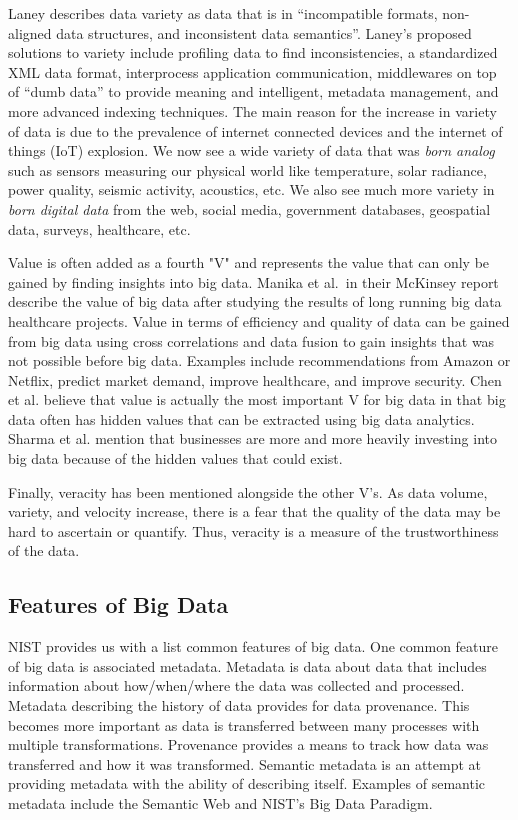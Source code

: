 \documentclass[]{article}
\begin{document}
Laney describes data variety as data that is in ``incompatible formats, non-aligned data structures, and inconsistent data semantics''. Laney's proposed solutions to variety include profiling data to find inconsistencies, a standardized XML data format, interprocess application communication, middlewares on top of ``dumb data'' to provide meaning and intelligent, metadata management, and more advanced indexing techniques. The main reason for the increase in variety of data is due to the prevalence of internet connected devices and the internet of things (IoT) explosion. We now see a wide variety of data that was \textit{born analog} such as sensors measuring our physical world like temperature, solar radiance, power quality, seismic activity, acoustics, etc. We also see much more variety in \textit{born digital data} from the web, social media, government databases, geospatial data, surveys, healthcare, etc\cite{pcast}.

Value is often added as a fourth "V" and represents the value that can only be gained by finding insights into big data. Manika et al.\ in their McKinsey report\cite{manyika2011big} describe the value of big data after studying the results of long running big data healthcare projects. Value in terms of efficiency and quality of data can be gained from big data using cross correlations and data fusion to gain insights that was not possible before big data. Examples include recommendations from Amazon or Netflix, predict market demand, improve healthcare, and improve security\cite{marr_2015}. Chen et al.\cite{chen_big_2014} believe that value is actually the most important V for big data in that big data often has hidden values that can be extracted using big data analytics. Sharma et al.\cite{sharma_extended_2015} mention that businesses are more and more heavily investing into big data because of the hidden values that could exist.

Finally, veracity has been mentioned alongside the other V's\cite{sharma_extended_2015}. As data volume, variety, and velocity increase, there is a fear that the quality of the data may be hard to ascertain or quantify. Thus, veracity is a measure of the trustworthiness of the data.

\subsection{Features of Big Data}\label{ssec:features-of-big-data}
NIST\cite{nist_big_data_2015} provides us with a list common features of big data. One common feature of big data is associated metadata. Metadata is data about data that includes information about how/when/where the data was collected and processed. Metadata describing the history of data provides for data provenance. This becomes more important as data is transferred between many processes with multiple transformations. Provenance provides a means to track how data was transferred and how it was transformed. Semantic metadata is an attempt at providing metadata with the ability of describing itself. Examples of semantic metadata include the Semantic Web\cite{berners-lee_semantic_2001} and NIST's Big Data Paradigm. 
\end{document}
